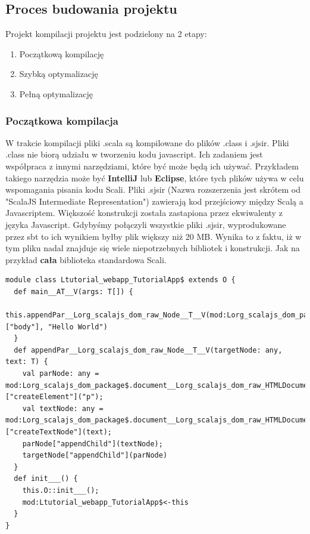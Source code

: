 
\subsection{Proces budowania projektu}

Projekt kompilacji projektu jest podzielony na 2 etapy\cite{HandsOnScalaPipeline}:
\begin{enumerate}
	\item Początkową kompilację
	\item Szybką optymalizację
	\item Pełną optymalizację
\end{enumerate}

\subsubsection{Początkowa kompilacja}

W trakcie kompilacji pliki .scala są kompilowane do plików .class i .sjsir. 
Pliki .class nie biorą udziału w tworzeniu kodu javascript. Ich zadaniem jest współpraca z innymi narzędziami, które być może będą ich używać. Przykładem takiego narzędzia może być \textbf{IntelliJ} lub \textbf{Eclipse}, które tych plików używa w celu wspomagania pisania kodu Scali.
Pliki .sjsir (Nazwa rozszerzenia jest skrótem od "ScalaJS Intermediate Representation")\cite{ScalaCompilationProcess} zawierają kod przejściowy między Scalą a Javascriptem. Większość konstrukcji została zastapiona przez ekwiwalenty z języka Javascript. 
Gdybyśmy połączyli wszystkie pliki .sjsir, wyprodukowane przez sbt to ich wynikiem byłby plik większy niż 20 MB. Wynika to z faktu, iż w tym pliku nadal znajduje się wiele niepotrzebnych bibliotek i konstrukcji. Jak na przykład \textbf{cała} biblioteka standardowa Scali.


\begin{lstlisting}[label={lst:scalasbt},
frame=single, numbers=none,captionpos=b, 
caption={Przykładowy plik .sjsir dla projektu wyświetlającego HelloWorld na ekranie.}]
module class Ltutorial_webapp_TutorialApp$ extends O {
  def main__AT__V(args: T[]) {
    this.appendPar__Lorg_scalajs_dom_raw_Node__T__V(mod:Lorg_scalajs_dom_package$.document__Lorg_scalajs_dom_raw_HTMLDocument()["body"], "Hello World")
  }
  def appendPar__Lorg_scalajs_dom_raw_Node__T__V(targetNode: any, text: T) {
    val parNode: any = mod:Lorg_scalajs_dom_package$.document__Lorg_scalajs_dom_raw_HTMLDocument()["createElement"]("p");
    val textNode: any = mod:Lorg_scalajs_dom_package$.document__Lorg_scalajs_dom_raw_HTMLDocument()["createTextNode"](text);
    parNode["appendChild"](textNode);
    targetNode["appendChild"](parNode)
  }
  def init___() {
    this.O::init___();
    mod:Ltutorial_webapp_TutorialApp$<-this
  }
}
\end{lstlisting}

